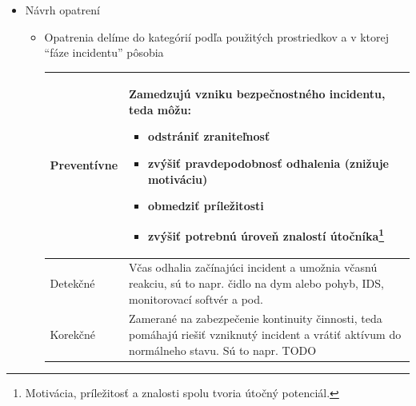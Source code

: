 \documentclass[12pt,a4paper]{article}
\begin{document}
{\begin{itemize}
\begin{itemize}
            \item vyhnutie sa riziku -- zmena podmienok, ktoré viedli k vysokej hodnote rizika, napr. činnosť vykonávame iným spôsobom, v inom (menej nebezpečnom) prostredí
            \item prenesenie rizika -- riziko znáša subjekt, ktorý ho vie efektívnejšie riešiť, teda napr. poistenie, vyššia SLA\footnote{SLA=Service Level Agreement -- zmluva medzi zákazníkom a dodávateľom špecifikujúca o.i. napríklad garantovaný uptime, response time, resolution time, parametre ako throughput/latencia.}
        \end{itemize}
        \item Návrh opatrení 
        \begin{itemize}
            \item Opatrenia delíme do kategórií podľa použitých prostriedkov a v ktorej ``fáze incidentu'' pôsobia

        \begin{table}[htbp]
            \centering
            \begin{tabular}{|l|p{11cm}|}
              \hline
              Preventívne &
              \footnotesize
              Zamedzujú vzniku bezpečnostného incidentu, teda môžu:
              \begin{itemize}\setlength\itemsep{0pt}
                \item odstrániť zraniteľnosť
                \item zvýšiť pravdepodobnosť odhalenia (znižuje motiváciu)
                \item obmedziť príležitosti
                \item zvýšiť potrebnú úroveň znalostí útočníka\footnote{Motivácia, príležitosť a znalosti spolu tvoria útočný potenciál.}
              \end{itemize} \\ \hline
              Detekčné & Včas odhalia začínajúci incident a umožnia včasnú reakciu, sú to napr. čidlo na dym alebo pohyb, IDS, monitorovací softvér a pod.\\ \hline
              Korekčné & Zamerané na zabezpečenie kontinuity činnosti, teda pomáhajú riešiť vzniknutý incident a vrátiť aktívum do normálneho stavu. Sú to napr. TODO\\ \hline
            \end{tabular}
        \end{table}   



\end{itemize}
\end{itemize}}
\end{document}
